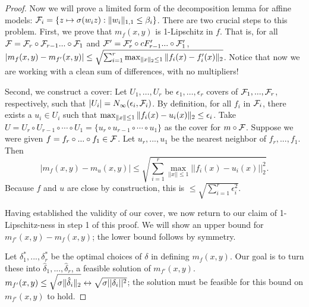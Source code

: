 \begin{proof}
Now we will prove a limited form of the decomposition lemma for affine models: $\mathcal F_i = \{ z \mapsto \sigma(w_i z): \|w_i\|_{1, 1} \leq \beta_i \}$. There are two crucial steps to this problem. First, we prove that $m_f(x, y)$ is 1-Lipschitz in $f$. That is, for all $\mathcal F = \mathcal F_r \circ \mathcal F_{r-1} ... \circ \mathcal F_1$ and $\mathcal F' = \mathcal F_r' \circ 
cF_{r-1}' ... \circ \mathcal F_1'$, $|m_f(x, y) - m_{f'}(x, y)| \leq \sqrt{\sum_{i=1}^r \max_{\|x\|_2 \leq 1} \|f_i(x) - f_i'(x)\|_2}$. Notice that now we are working with a clean sum of differences, with no multipliers!

Second, we construct a cover: Let $U_1, \dots, U_r$ be $\epsilon_1, \dots, \epsilon_r$ covers of $\mathcal F_1, ..., \mathcal F_r$, respectively, such that $|U_i| = N_\infty(\epsilon_i, \mathcal F_i)$. By definition, for all $f_i$ in $\mathcal F_i$, there exists a $u_i \in U_i$ such that $\max_{\|x\| \leq 1} \|f_i(x) - u_i(x)\|_2 \leq \epsilon_i$. Take $U = U_r \circ U_{r-1} \circ \cdots \circ U_1 = \{u_r \circ u_{r-1} \circ \cdots \circ u_1 \}$ as the cover for $m \circ \mathcal F$. Suppose we were given $f = f_r \circ ... \circ f_1 \in \mathcal F$. Let $u_r, ..., u_1$ be the nearest neighbor of $f_r, ..., f_1$. Then
\begin{equation}
|m_f(x, y) - m_u(x, y)| \leq \sqrt{\sum_{i=1}^r \max_{||x|| \leq 1} ||f_i(x) - u_i(x)||_2^2}.
\end{equation}
Because $f$ and $u$ are close by construction, this is $\leq \sqrt{\sum_{i=1}^r \epsilon_i^2}$.

Having established the validity of our cover, we now return to our claim of 1-Lipschitz-ness in step 1 of this proof. We will show an upper bound for $m_{f'}(x, y) - m_f(x, y)$; the lower bound follows by symmetry.

Let $\delta_1^*, ..., \delta_r^*$ be the optimal choices of $\delta$ in defining $m_f(x, y)$. Our goal is to turn these into $\hat{\delta}_1, ..., \hat{\delta}_r$, a feasible solution of $m_{f'}(x, y)$. $m_{f'}(x, y) \leq \sqrt{\sigma \|\hat{\delta}_i\|_2} \leftrightarrow \sqrt{\sigma||\delta_i||^2}$; the solution must be feasible for this bound on $m_{f'}(x, y)$ to hold.


\end{proof}
